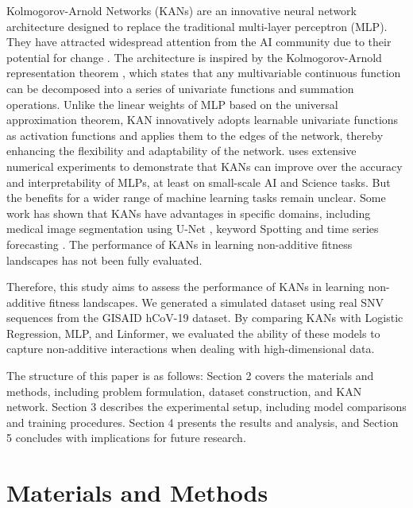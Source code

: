 \documentclass{article}
\begin{document}
Kolmogorov-Arnold Networks (KANs) are an innovative neural network architecture designed to replace the traditional multi-layer perceptron (MLP). They have attracted widespread attention from the AI community due to their potential for change \parencite{vaca2024kolmogorov}. The architecture is inspired by the Kolmogorov-Arnold representation theorem \parencite{kolmogorov1961representation, kolmogorov1957representation, braun2009constructive}, which states that any multivariable continuous function can be decomposed into a series of univariate functions and summation operations. Unlike the linear weights of MLP based on the universal approximation theorem, KAN innovatively adopts learnable univariate functions as activation functions and applies them to the edges of the network, thereby enhancing the flexibility and adaptability of the network. \textcite{liu2024kankolmogorovarnoldnetworks} uses extensive numerical experiments to demonstrate that KANs can improve over the accuracy and interpretability of MLPs, at least on small-scale AI and Science tasks. But the benefits for a wider range of machine learning tasks remain unclear. Some work has shown that KANs have advantages in specific domains, including medical image segmentation using U-Net \parencite{li2024u}, keyword Spotting \parencite{xu2024effective} and time series forecasting \parencite{vaca2024kolmogorov}. The performance of KANs in learning non-additive fitness landscapes has not been fully evaluated.


Therefore, this study aims to assess the performance  of KANs in learning non-additive fitness landscapes. We generated a simulated dataset using real SNV sequences from the GISAID hCoV-19 dataset. By comparing KANs with Logistic Regression, MLP, and Linformer, we evaluated the ability of these models to capture non-additive interactions when dealing with high-dimensional data.


The structure of this paper is as follows: Section 2 covers the materials and methods, including problem formulation, dataset construction, and KAN network. Section 3 describes the experimental setup, including model comparisons and training procedures. Section 4 presents the results and analysis, and Section 5 concludes with implications for future research.

\section{Materials and Methods}
\end{document}
